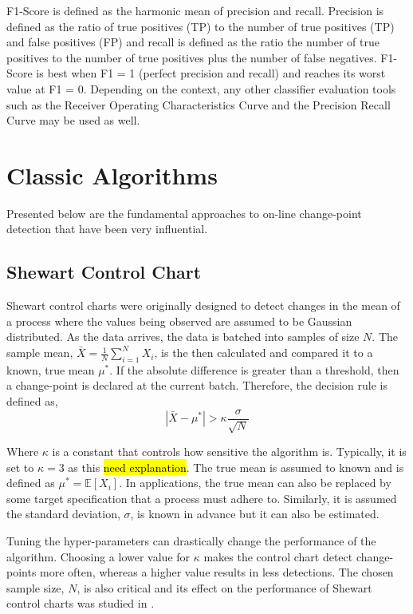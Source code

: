  F1-Score is defined as the harmonic mean of precision and recall. Precision is defined as the ratio of true positives (TP) to the
number of true positives (TP) and false positives (FP) and recall is defined as the ratio the number of true positives to the
number of true positives plus the number of false negatives. F1-Score is best when F1 = 1 (perfect precision and recall) and reaches its worst value at F1 = 0. Depending on the context, any other classifier evaluation tools such as the Receiver Operating Characteristics Curve and the Precision Recall Curve may be used as well.

\section{Classic Algorithms}
Presented below are the fundamental approaches to on-line change-point detection that have been very influential. 

\subsection{Shewart Control Chart}
Shewart control charts were originally designed to detect changes in the mean of a process where the values being observed are assumed to be Gaussian distributed. As the data arrives, the data is batched into samples of size $N$.  The sample mean, $\bar{X}=\frac{1}{N} \sum_{i=1}^N X_i$, is the then calculated and compared it to a known, true mean $\mu^*$. If the absolute difference is greater than a threshold, then a change-point is declared at the current batch. Therefore, the decision rule is defined as,
\begin{equation}
|\bar{X}-\mu^*| > \kappa \frac{\sigma}{\sqrt{N}}
\end{equation}

Where $\kappa$ is a constant that controls how sensitive the algorithm is. Typically, it is set to $\kappa=3$ as this \hl{need explanation}.
The true mean is assumed to known and is defined as $\mu^* = \mathbb{E}[X_i]$. In applications, the true mean can also be replaced by some target specification that a process must adhere to. Similarly, it is assumed the standard deviation, $\sigma$, is known in advance but it can also be estimated.

Tuning the hyper-parameters can drastically change the performance of the algorithm. Choosing a lower value for $\kappa$ makes the control chart detect change-points more often, whereas a higher value results in less detections. The chosen sample size, $N$, is also critical and its effect on the performance of Shewart control charts was studied in \cite{haridy2017effect}.


